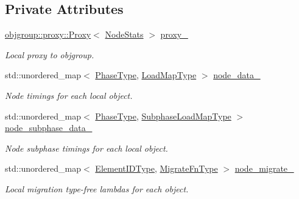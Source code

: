 \subsection*{Private Attributes}
\begin{DoxyCompactItemize}
\item 
\hyperlink{structvt_1_1objgroup_1_1proxy_1_1_proxy}{objgroup\+::proxy\+::\+Proxy}$<$ \hyperlink{structvt_1_1vrt_1_1collection_1_1balance_1_1_node_stats}{Node\+Stats} $>$ \hyperlink{structvt_1_1vrt_1_1collection_1_1balance_1_1_node_stats_ab0f4d7d14401bec36a6bfca304935032}{proxy\+\_\+}
\begin{DoxyCompactList}\small\item\em Local proxy to objgroup. \end{DoxyCompactList}\item 
std\+::unordered\+\_\+map$<$ \hyperlink{namespacevt_a46ce6733d5cdbd735d561b7b4029f6d7}{Phase\+Type}, \hyperlink{namespacevt_1_1vrt_1_1collection_1_1balance_a45306ee4bf38fe3fb586d1ee2fa3d147}{Load\+Map\+Type} $>$ \hyperlink{structvt_1_1vrt_1_1collection_1_1balance_1_1_node_stats_ab6fa4f5cc9789586b7a8adc59fe8a184}{node\+\_\+data\+\_\+}
\begin{DoxyCompactList}\small\item\em Node timings for each local object. \end{DoxyCompactList}\item 
std\+::unordered\+\_\+map$<$ \hyperlink{namespacevt_a46ce6733d5cdbd735d561b7b4029f6d7}{Phase\+Type}, \hyperlink{namespacevt_1_1vrt_1_1collection_1_1balance_a3d91523158c1025b7b665240072f3b7e}{Subphase\+Load\+Map\+Type} $>$ \hyperlink{structvt_1_1vrt_1_1collection_1_1balance_1_1_node_stats_aa9c06fa76c472858769ebe545f29d7a2}{node\+\_\+subphase\+\_\+data\+\_\+}
\begin{DoxyCompactList}\small\item\em Node subphase timings for each local object. \end{DoxyCompactList}\item 
std\+::unordered\+\_\+map$<$ \hyperlink{namespacevt_1_1vrt_1_1collection_1_1balance_a14c8d2c972f2913aa3f1636e5be0a120}{Element\+I\+D\+Type}, \hyperlink{structvt_1_1vrt_1_1collection_1_1balance_1_1_node_stats_af702e521887d9015e33a7aedda48d09d}{Migrate\+Fn\+Type} $>$ \hyperlink{structvt_1_1vrt_1_1collection_1_1balance_1_1_node_stats_afa1909d31a49209692d1c1cb04f64f44}{node\+\_\+migrate\+\_\+}
\begin{DoxyCompactList}\small\item\em Local migration type-\/free lambdas for each object. \end{DoxyCompactList}\item 

\end{DoxyCompactItemize}
